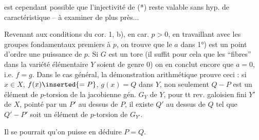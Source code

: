 est cependant possible que l'injectivité de (*) reste valable sans hyp. de caractéristique -- à examiner de plus près...

Revenant aux conditions du cor. 1, b), en car. $p>0$, en travaillant avec les groupes fondamentaux premiers à $p$, on trouve que le $a$ dans 1°) est un point  d'ordre une puissance de $p$. Si $G$ est un tore (il suffit pour cela que les ``fibres'' dans la variété élémentaire $Y$ soient de genre 0) on en conclut encore que $a=0$, i.e. $f=g$. Dans le cas général, la démonstration arithmétique prouve  ceci : si $x\in X$,   $f(x)\inserted{=P}$, $g(x)=Q$ dans $Y$, non seulement $Q-P$ est un élément de $p$-torsion de la jacobienne gén. $G_Y$ de $Y$, pour tt rev.  galoisien fini $Y'$ de $X$,  pointé par un $P'$ au dessus de $P$, il existe $Q'$ au dessus de $Q$ tel que $Q'-P'$ soit un élément de  $p$-torsion de $G_{Y'}$.

Il se pourrait qu'on puisse en déduire $P=Q$.

